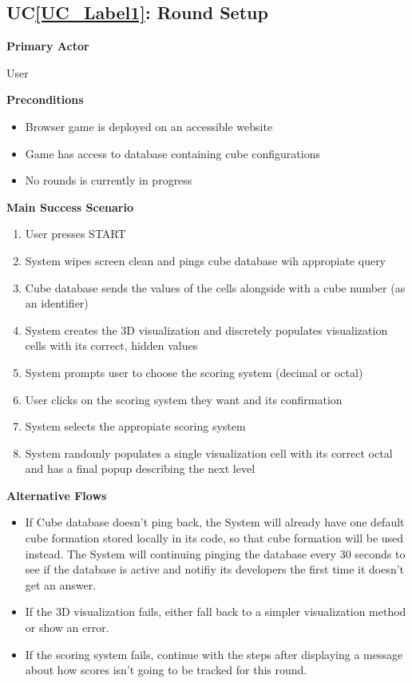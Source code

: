 \documentclass[12pt]{article}
\newcounter{ucnum} %
\newcommand{\ucref}[1]{UC\ref{#1}}
\begin{document}
 \label{UC_Label1}
\subsection{\ucref{UC_Label1}: Round Setup}

\textbf{Primary Actor}

User

\textbf{Preconditions}
\begin{itemize}
\item Browser game is deployed on an accessible website
\item Game has access to database containing cube configurations
\item No rounds is currently in progress
\end{itemize}

\textbf{Main Success Scenario}
\begin{enumerate}
\item User presses START
\item System wipes screen clean and pings cube database wih appropiate query
\item Cube database sends the values of the cells alongside with a cube number (as an identifier)
\item System creates the 3D visualization and discretely populates visualization cells with its correct, hidden values
\item System prompts user to choose the scoring system (decimal or octal)
\item User clicks on the scoring system they want and its confirmation
\item System selects the appropiate scoring system
\item System randomly populates a single visualization cell with its correct octal and has a final popup describing the next level
\end{enumerate}

\textbf{Alternative Flows}
\begin{itemize}
\item If Cube database doesn't ping back, the System will already have one default cube formation stored locally in its code, so that cube formation will be used instead. 
The System will continuing pinging the database every 30 seconds to see if the database is active and notifiy its developers the first time it doesn't get an answer.
\item If the 3D visualization fails, either fall back to a simpler visualization method or show an error.
\item If the scoring system fails, continue with the steps after displaying a message about how scores isn't going to be tracked for this round.
\end{itemize}
\end{document}
